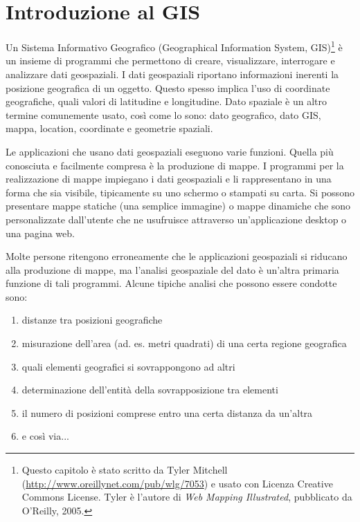 \pagestyle{scrheadings}
\chapter{Introduzione al GIS}\label{label_intro}


Un Sistema Informativo Geografico (Geographical Information System,
GIS)\cite{mitchel05}\footnote{Questo capitolo è stato scritto da Tyler
Mitchell (\url{http://www.oreillynet.com/pub/wlg/7053}) e usato con Licenza Creative Commons License. Tyler è l'autore di 
\textit{Web Mapping Illustrated}, pubblicato da O'Reilly, 2005.}
è un insieme di programmi che permettono di creare, visualizzare,
interrogare e analizzare dati geospaziali. I dati geospaziali riportano
informazioni inerenti la posizione geografica di un oggetto. Questo
spesso implica l'uso di coordinate geografiche, quali valori di latitudine
e longitudine. Dato spaziale è un altro termine comunemente usato,
così come lo sono: dato geografico, dato GIS, mappa, location,
coordinate e geometrie spaziali.

Le applicazioni che usano dati geospaziali eseguono varie funzioni.
Quella più conosciuta e facilmente compresa è la produzione di mappe.
I programmi per la realizzazione di mappe impiegano i dati geospaziali
e li rappresentano in una forma che sia visibile, tipicamente su uno
schermo o stampati su carta. Si possono presentare mappe statiche
(una semplice immagine) o mappe dinamiche che sono personalizzate
dall'utente che ne usufruisce attraverso un'applicazione desktop o una pagina web.

Molte persone ritengono erroneamente che le applicazioni geospaziali
si riducano alla produzione di mappe, ma l'analisi geospaziale del
dato è un'altra primaria funzione di tali programmi. Alcune tipiche
analisi che possono essere condotte sono:

\begin{enumerate}
\item distanze tra posizioni geografiche
\item misurazione dell'area (ad. es. metri quadrati) di una certa regione
geografica
\item quali elementi geografici si sovrappongono ad altri
\item determinazione dell'entità della sovrapposizione tra elementi
\item il numero di posizioni comprese entro una certa distanza da un'altra
\item e così via... 
\end{enumerate}

